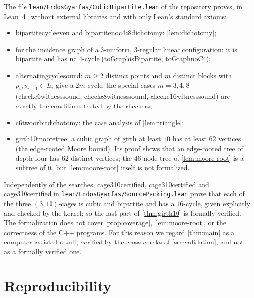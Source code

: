 \documentclass[11pt]{amsart}
\theoremstyle{definition}
\theoremstyle{remark}
\newcommand{\leanus}{\textunderscore\allowbreak}
\newcommand{\lean}[1]{{\ttfamily\let\_\leanus #1}}
\newcommand{\code}[1]{\texttt{#1}}
\begin{document}
The file \code{lean/ErdosGyarfas/CubicBipartite.lean} of the repository proves,
in Lean~4~\cite{Lean4} without external libraries and with only Lean's standard
axioms:
\begin{itemize}[leftmargin=1.5em]
\item \lean{bipartite\_cycle\_even} and \lean{bipartite\_no\_c4\_c8\_dichotomy}:
  \cref{lem:dichotomy};
\item for the incidence graph of a $3$-uniform, $3$-regular linear configuration:
  it is bipartite and has no $4$-cycle (\lean{toGraph\_isBipartite},
  \lean{toGraph\_no\_C4});
\item \lean{alternating\_cycle\_sound}: $m\ge 2$ distinct points and $m$
  distinct blocks with $p_i,p_{i+1}\in B_i$ give a $2m$-cycle; the special cases
  $m=3,4,8$ (\lean{check\_c6\_witness\_sound}, \lean{check\_c8\_witness\_sound},
  \lean{check\_c16\_witness\_sound}) are exactly the conditions tested by the
  checkers;
\item \lean{c6\_two\_orbit\_dichotomy}: the case analysis of \cref{lem:triangle};
\item \lean{girth10\_moore\_tree\_62}: a cubic graph of girth at least $10$ has
  at least $62$ vertices (the edge-rooted Moore bound). Its proof shows that an
  edge-rooted tree of depth four has $62$ distinct vertices; the $46$-node tree of
  \cref{lem:moore-root} is a subtree of it, but \cref{lem:moore-root} itself is
  not formalized.
\end{itemize}
Independently of the searches, \lean{cage310\_1\_certified},
\lean{cage310\_2\_certified} and \lean{cage310\_3\_certified} in
\code{lean/ErdosGyarfas/SourcePacking.lean} prove that each of the three
$(3,10)$-cages is cubic and bipartite and has a $16$-cycle, given explicitly
and checked by the kernel; so the last part of \cref{thm:girth10} is formally
verified.
The formalization does not cover \cref{prop:coverage}, \cref{lem:moore-root},
or the correctness of the C++ programs. For this reason
we regard \cref{thm:main} as a computer-assisted result, verified by the
cross-checks of \cref{sec:validation}, and not as a formally verified one.

\section{Reproducibility}\label{sec:repro}
\end{document}
